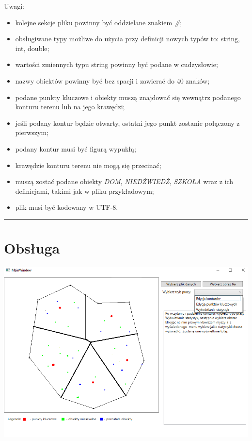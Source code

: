 \documentclass[a4paper,11pt]{article}
\newcommand{\linia}{\rule{\linewidth}{0.4mm}}
\begin{document}
Uwagi:
\begin{itemize}
\item kolejne sekcje pliku powinny być oddzielane znakiem \textit{\#};
\item obsługiwane typy możliwe do użycia przy definicji nowych typów to: string, int, double;
\item wartości zmiennych typu string powinny być podane w cudzysłowie;
\item nazwy obiektów powinny być bez spacji i zawierać do 40 znaków;
\item podane punkty kluczowe i obiekty muszą znajdować się wewnątrz podanego konturu terenu lub na jego krawędzi;
\item jeśli podany kontur będzie otwarty, ostatni jego punkt zostanie połączony z pierwszym;
\item podany kontur musi być figurą wypukłą;
\item krawędzie konturu terenu nie mogą się przecinać;
\item muszą zostać podane obiekty \textit{DOM}, \textit{NIEDŹWIEDŹ}, \textit{SZKOŁA} wraz z ich definicjami, takimi jak w pliku przykładowym;
\item plik musi być kodowany w UTF-8.
\end{itemize}
\noindent\linia
\section{Obsługa}
\includegraphics[scale=0.75]{GUI_EXAMPLE.png}
\end{document}

